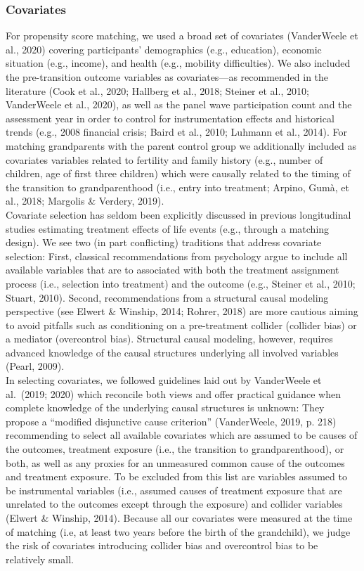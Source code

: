 \documentclass[
  english,
  man, noextraspace]{apa7}
\begin{document}
\hypertarget{covariates}{%
\subsubsection{Covariates}\label{covariates}}

For propensity score matching, we used a broad set of covariates (VanderWeele et al., 2020) covering participants' demographics (e.g., education), economic situation (e.g., income), and health (e.g., mobility difficulties). We also included the pre-transition outcome variables as covariates---as recommended in the literature (Cook et al., 2020; Hallberg et al., 2018; Steiner et al., 2010; VanderWeele et al., 2020), as well as the panel wave participation count and the assessment year in order to control for instrumentation effects and historical trends (e.g., 2008 financial crisis; Baird et al., 2010; Luhmann et al., 2014). For matching grandparents with the parent control group we additionally included as covariates variables related to fertility and family history (e.g., number of children, age of first three children) which were causally related to the timing of the transition to grandparenthood (i.e., entry into treatment; Arpino, Gumà, et al., 2018; Margolis \& Verdery, 2019).\\
Covariate selection has seldom been explicitly discussed in previous longitudinal studies estimating treatment effects of life events (e.g., through a matching design). We see two (in part conflicting) traditions that address covariate selection: First, classical recommendations from psychology argue to include all available variables that are to associated with both the treatment assignment process (i.e., selection into treatment) and the outcome (e.g., Steiner et al., 2010; Stuart, 2010). Second, recommendations from a structural causal modeling perspective (see Elwert \& Winship, 2014; Rohrer, 2018) are more cautious aiming to avoid pitfalls such as conditioning on a pre-treatment collider (collider bias) or a mediator (overcontrol bias). Structural causal modeling, however, requires advanced knowledge of the causal structures underlying all involved variables (Pearl, 2009).\\
In selecting covariates, we followed guidelines laid out by VanderWeele et al.~(2019; 2020) which reconcile both views and offer practical guidance when complete knowledge of the underlying causal structures is unknown: They propose a \enquote{modified disjunctive cause criterion} (VanderWeele, 2019, p. 218) recommending to select all available covariates which are assumed to be causes of the outcomes, treatment exposure (i.e., the transition to grandparenthood), or both, as well as any proxies for an unmeasured common cause of the outcomes and treatment exposure. To be excluded from this list are variables assumed to be instrumental variables (i.e., assumed causes of treatment exposure that are unrelated to the outcomes except through the exposure) and collider variables (Elwert \& Winship, 2014). Because all our covariates were measured at the time of matching (i.e, at least two years before the birth of the grandchild), we judge the risk of covariates introducing collider bias and overcontrol bias to be relatively small.\\
\end{document}
